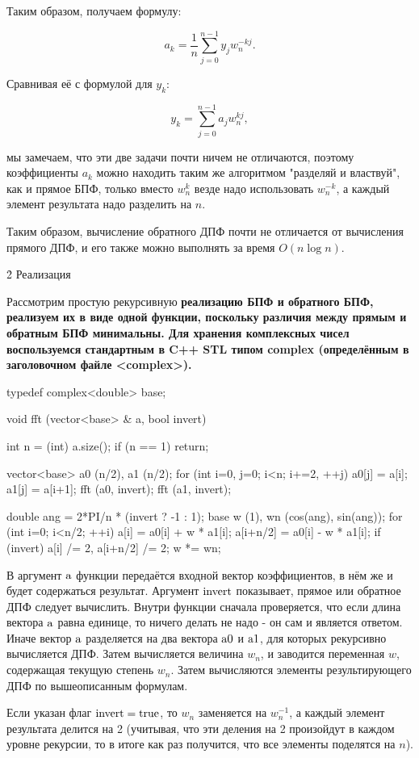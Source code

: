 Таким образом, получаем формулу:

$$ a_k = \frac{1}{n} \sum_{j=0}^{n-1} y_j w_n^{-kj}. $$

Сравнивая её с формулой для $y_k$:

$$ y_k = \sum_{j=0}^{n-1} a_j w_n^{kj}, $$

мы замечаем, что эти две задачи почти ничем не отличаются, поэтому коэффициенты $a_k$ можно находить таким же алгоритмом "разделяй и властвуй", как и прямое БПФ, только вместо $w_n^k$ везде надо использовать $w_n^{-k}$, а каждый элемент результата надо разделить на $n$.

Таким образом, вычисление обратного ДПФ почти не отличается от вычисления прямого ДПФ, и его также можно выполнять за время $O(n \log n)$.


\h2{ Реализация }

Рассмотрим простую рекурсивную \bf{реализацию БПФ} и обратного БПФ, реализуем их в виде одной функции, поскольку различия между прямым и обратным БПФ минимальны. Для хранения комплексных чисел воспользуемся стандартным в C++ STL типом complex (определённым в заголовочном файле <complex>).

\code
typedef complex<double> base;

void fft (vector<base> & a, bool invert) {
	int n = (int) a.size();
	if (n == 1)  return;

	vector<base> a0 (n/2),  a1 (n/2);
	for (int i=0, j=0; i<n; i+=2, ++j) {
		a0[j] = a[i];
		a1[j] = a[i+1];
	}
	fft (a0, invert);
	fft (a1, invert);

	double ang = 2*PI/n * (invert ? -1 : 1);
	base w (1),  wn (cos(ang), sin(ang));
	for (int i=0; i<n/2; ++i) {
		a[i] = a0[i] + w * a1[i];
		a[i+n/2] = a0[i] - w * a1[i];
		if (invert)
			a[i] /= 2,  a[i+n/2] /= 2;
		w *= wn;
	}
}
\endcode

В аргумент $\rm a$ функции передаётся входной вектор коэффициентов, в нём же и будет содержаться результат. Аргумент $\rm invert$ показывает, прямое или обратное ДПФ следует вычислить. Внутри функции сначала проверяется, что если длина вектора $\rm a$ равна единице, то ничего делать не надо - он сам и является ответом. Иначе вектор $\rm a$ разделяется на два вектора $\rm a0$ и $\rm a1$, для которых рекурсивно вычисляется ДПФ. Затем вычисляется величина $w_n$, и заводится переменная $w$, содержащая текущую степень $w_n$. Затем вычисляются элементы результирующего ДПФ по вышеописанным формулам.

Если указан флаг $\rm invert = true$, то $w_n$ заменяется на $w_n^{-1}$, а каждый элемент результата делится на 2 (учитывая, что эти деления на 2 произойдут в каждом уровне рекурсии, то в итоге как раз получится, что все элементы поделятся на $n$).


